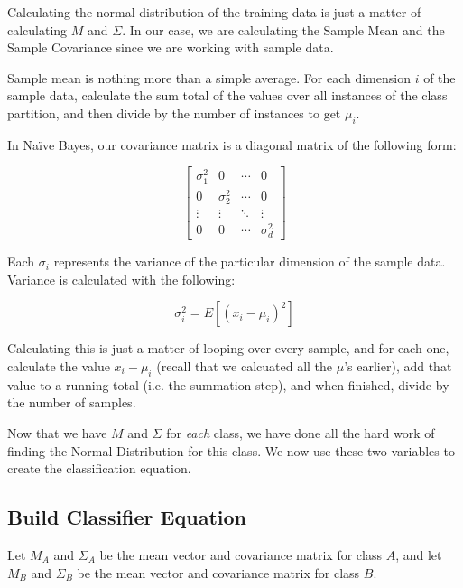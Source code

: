 \documentclass{article}
\begin{document}
Calculating the normal distribution of the training data is just a
matter of calculating $M$ and $\Sigma$.  In our case, we are
calculating the Sample Mean and the Sample Covariance
\cite{wiki_covariance} since we are working with sample data.

Sample mean is nothing more than a simple average.  For each dimension
$i$ of the sample data, calculate the sum total of the values over all
instances of the class partition, and then divide by the number of
instances to get $\mu_i$.

In Na\"ive Bayes, our covariance matrix is a diagonal matrix of the
following form:

\begin{displaymath}
\begin{bmatrix} \sigma^2_1 & 0 & \cdots & 0 \\
				 0 & \sigma^2_2 & \cdots & 0 \\
				 \vdots & \vdots & \ddots & \vdots \\
				 0 & 0 & \cdots & \sigma^2_d
\end{bmatrix}
\end{displaymath}

Each $\sigma_i$ represents the variance of the particular dimension of
the sample data.  Variance is calculated with the following:

\begin{displaymath}
 \sigma^2_i = E [{(x_i - \mu_i)}^2]
\end{displaymath}

Calculating this is just a matter of looping over every sample, and
for each one, calculate the value $x_i - \mu_i$ (recall that we
calcuated all the $\mu$'s earlier), add that value to a running total
(i.e. the summation step), and when finished, divide by the number of
samples.

Now that we have $M$ and $\Sigma$ for \emph{each} class, we have done
all the hard work of finding the Normal Distribution for this class.
We now use these two variables to create the classification equation.

\subsection{Build Classifier Equation}

Let $M_A$ and $\Sigma_A$ be the mean vector and covariance matrix for
class $A$, and let $M_B$ and $\Sigma_B$ be the mean vector and
covariance matrix for class $B$.
\end{document}
